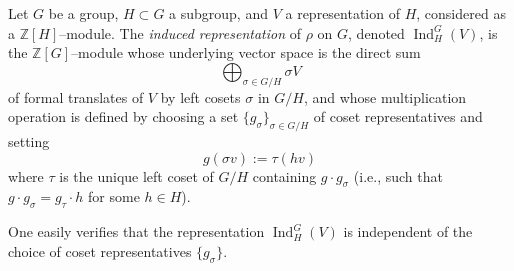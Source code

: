 \documentclass[12pt]{article}
\begin{document}
Let $G$ be a group, $H \subset G$ a subgroup, and $V$ a representation of $H$, considered as a $\mathbb{Z}[H]$--module. The {\em induced representation} of $\rho$ on $G$, denoted $\operatorname{Ind}_H^G(V)$, is the $\mathbb{Z}[G]$--module whose underlying vector space is the direct sum
$$
\bigoplus_{\sigma \in G/H} \sigma V
$$
of formal translates of $V$ by left cosets $\sigma$ in $G/H$, and whose multiplication operation is defined by choosing a set $\{g_\sigma\}_{\sigma \in G/H}$ of coset representatives and setting
$$
g(\sigma v) := \tau (h v)
$$
where $\tau$ is the unique left coset of $G/H$ containing $g \cdot g_\sigma$ (i.e., such that $g \cdot g_\sigma = g_\tau \cdot h$ for some $h \in H$).

One easily verifies that the representation $\operatorname{Ind}_H^G(V)$ is independent of the choice of coset representatives $\{g_\sigma\}$.
\end{document}
